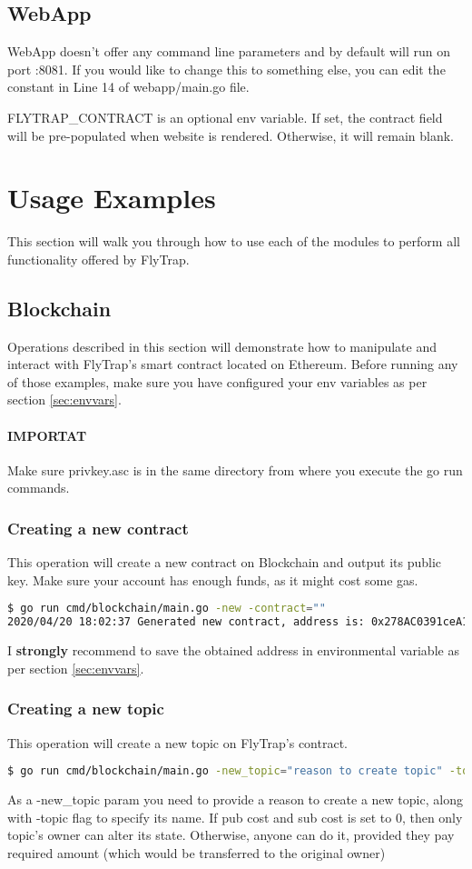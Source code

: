 \subsection{WebApp}
WebApp doesn't offer any command line parameters and by default will run on port :8081. If you would like to change this to something else, you can edit the constant in Line 14 of webapp/main.go file.

FLYTRAP\_CONTRACT is an optional env variable. If set, the contract field will be pre-populated when website is rendered. Otherwise, it will remain blank.
\section{Usage Examples}
This section will walk you through how to use each of the modules to perform all functionality offered by FlyTrap.
\subsection{Blockchain}
Operations described in this section will demonstrate how to manipulate and interact with FlyTrap's smart contract located on Ethereum. Before running any of those examples, make sure you have configured your env variables as per section \ref{sec:envvars}.

\paragraph{IMPORTAT} Make sure privkey.asc is in the same directory from where you execute the go run commands.
\subsubsection{Creating a new contract}
This operation will create a new contract on Blockchain and output its public key. Make sure your account has enough funds, as it might cost some gas.
\begin{lstlisting}[language=bash,breaklines=true]
$ go run cmd/blockchain/main.go -new -contract=""
2020/04/20 18:02:37 Generated new contract, address is: 0x278AC0391ceA1E7664D4242C7398FCDe79539a93
\end{lstlisting}
I \textbf{strongly} recommend to save the obtained address in environmental variable as per section \ref{sec:envvars}.
\subsubsection{Creating a new topic}
This operation will create a new topic on FlyTrap's contract.
\begin{lstlisting}[language=bash,breaklines=true]
$ go run cmd/blockchain/main.go -new_topic="reason to create topic" -topic="MyTestingTopic" -pub_cost=0 -sub_cost=0
\end{lstlisting}
As a -new\_topic param you need to provide a reason to create a new topic, along with -topic flag to specify its name. If pub cost and sub cost is set to 0, then only topic's owner can alter its state. Otherwise, anyone can do it, provided they pay required amount (which would be transferred to the original owner)
